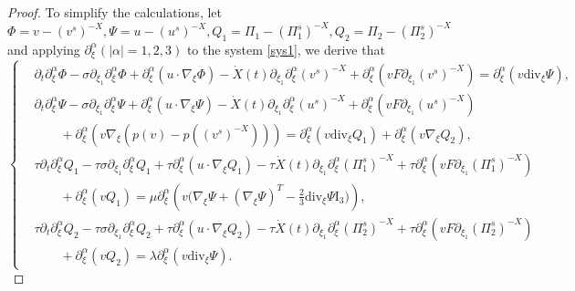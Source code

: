 \documentclass[10pt,reqno]{amsart}
\numberwithin{equation}{section}
\newcommand{\ddiv}{\mathrm{div}}
\begin{document}
\begin{proof}
To simplify the calculations, let $\Phi=v-(v^s)^{-X}, \Psi=u-(u^s)^{-X}, Q_1=\Pi_1-(\Pi_1^s)^{-X}, Q_2=\Pi_2-(\Pi_2^s)^{-X}$ and applying $\partial_\xi^\alpha(|\alpha|=1, 2, 3)$ to the system \eqref{sys1}, we derive that
\begin{equation}\label{sys3}
\begin{cases}
&\partial_t\partial_\xi^\alpha\Phi-\sigma\partial_{\xi_1}\partial_\xi^\alpha\Phi
        + \partial_\xi^\alpha\left(u\cdot\nabla_\xi\Phi\right)
        -\dot{X}(t)\partial_{\xi_1}\partial_\xi^\alpha(v^s)^{-X}
 +\partial_\xi^\alpha\left(vF\partial_{\xi_1}(v^s)^{-X}\right)
 =\partial_\xi^\alpha\left(v\ddiv_\xi\Psi\right),\\
&\partial_t\partial_\xi^\alpha\Psi-\sigma\partial_{\xi_1}\partial_\xi^\alpha\Psi
        +\partial_\xi^\alpha\left( u\cdot\nabla_\xi\Psi\right)
        -\dot{X}(t)\partial_{\xi_1}\partial_\xi^\alpha(u^s)^{-X}
        +\partial_\xi^\alpha\left(vF\partial_{\xi_1}(u^s)^{-X}\right)\\
&\qquad +\partial_\xi^\alpha\left(v\nabla_\xi\left(p(v)-p((v^s)^{-X})\right)\right)
               =\partial_\xi^\alpha\left(v\ddiv_\xi Q_1\right)
               +\partial_\xi^\alpha\left(v\nabla_\xi Q_2\right),\\
&\tau\partial_t\partial_\xi^\alpha Q_1
-\tau\sigma\partial_{\xi_1}\partial_\xi^\alpha Q_1
+\tau\partial_\xi^\alpha\left( u\cdot\nabla_\xi Q_1\right)
-\tau\dot{X}(t)\partial_{\xi_1}\partial_\xi^\alpha(\Pi_1^s)^{-X}
+\tau\partial_\xi^\alpha\left(v F\partial_{\xi_1}(\Pi_1^s)^{-X}\right)
\\
 & \qquad+\partial_\xi^\alpha\left(vQ_1\right)
 =\mu\partial_\xi^\alpha\left(v\Big(\nabla_\xi\Psi+\left(\nabla_\xi\Psi\right)^T
   -\frac{2}{3}\ddiv_\xi\Psi \mathrm I_3\Big)\right),\\
&\tau\partial_t\partial_\xi^\alpha Q_2
-\tau\sigma\partial_{\xi_1}\partial_\xi^\alpha Q_2
+\tau\partial_\xi^\alpha\left( u\cdot\nabla_\xi Q_2\right)
-\tau\dot{X}(t)\partial_{\xi_1}\partial_\xi^\alpha(\Pi_2^s)^{-X}
+\tau \partial_\xi^\alpha\left(vF\partial_{\xi_1}(\Pi_2^s)^{-X}\right)
\\
&\qquad+\partial_\xi^\alpha\left(vQ_2\right)
=\lambda\partial_\xi^\alpha\left(v\ddiv_\xi \Psi\right).
\end{cases}
\end{equation}


\end{proof}
\end{document}

